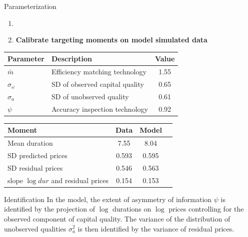 \documentclass[english,xcolor=svgnames,aspectratio=169]{beamer}
\begin{document}
\begin{frame}{Parameterization}

{\color{dblue}{Two-step procedure}}
\begin{enumerate}
\item {\color{gray}{Fix a subset of parameters to standard values}}
\item {\bf{Calibrate targeting moments on model simulated data}}
\end{enumerate}
\bigskip
\begin{footnotesize}
\begin{table}
\begin{tabular}{llc}
\hline
\hline
{\bf{Parameter}} & {\bf{Description}} & {\bf{Value}}\\
\hline
$\bar{m}$ & Efficiency matching technology & 1.55 \\
$\sigma_\omega$ & SD of observed capital quality & 0.65  \\
$\sigma_a$ & SD of unobserved quality & 0.61\\
$\psi$ & Accuracy inspection technology & 0.92 \\
\hline
\hline
\end{tabular}
\end{table}
\begin{table}
\begin{tabular}{lccc}
\hline
\hline
Moment & Data & Model \\
\hline
Mean duration & 7.55 & 8.04 \\
SD predicted prices &0.593  & 0.595  \\
SD residual prices & 0.546 &  0.563  \\
slope $\log dur$ and residual prices & 0.154 & 0.153 \\ \hline \hline
\end{tabular}
\end{table}
\end{footnotesize}
\end{frame}




\begin{frame}{Identification}
In the model, the extent of asymmetry of information $\psi$ is identified by the projection of $\log$
durations on $\log$ prices controlling for the observed component of capital quality. The variance of the distribution of unobserved qualities $\sigma^2_a$
is then identified by the variance of residual prices.
\end{frame}


\end{document}
